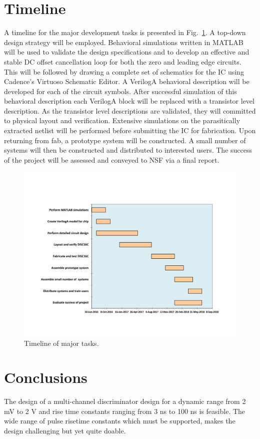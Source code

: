 \documentclass[12pt, onecolumn]{IEEEtran}
\begin{document}
\section*{Timeline}

\noindent
A timeline for the major development tasks is presented in Fig.~\ref{Timeline}. A top-down design strategy will be employed.  Behavioral simulations written in MATLAB will be used to validate the design specifications and to develop an effective and stable DC offset cancellation loop for both the zero and leading edge circuits.  This will be followed by drawing a complete set of schematics for the IC using Cadence's Virtuoso Schematic Editor. A VerilogA behavioral description will be developed for each of the circuit symbols. After successful simulation of this behavioral description each VerilogA block will be replaced with a transistor level description. As the transistor level descriptions are validated, they will committed to physical layout and verification.  Extensive simulations on the parasitically extracted netlist will be performed before submitting the IC for fabrication. Upon returning from fab, a prototype system will be constructed.  A small number of systems will then be constructed and distributed to interested users. The success of the project will be assessed and conveyed to NSF via a final report.

\begin{figure}[htbp!]
	\centering
 	\includegraphics[scale=0.8,keepaspectratio=true, angle=90]{./images/NSFtimeline.jpg}
 	\caption{Timeline of major tasks.}
 	\label{Timeline}
\end{figure}

\section*{Conclusions}

\noindent
The design of a multi-channel discriminator design for a dynamic range from 2 mV to 2 V and rise time constants ranging from 3 ns to 100 ns is feasible. The wide range of pulse risetime constants which must be supported, makes the design challenging but yet quite doable.



\end{document}
